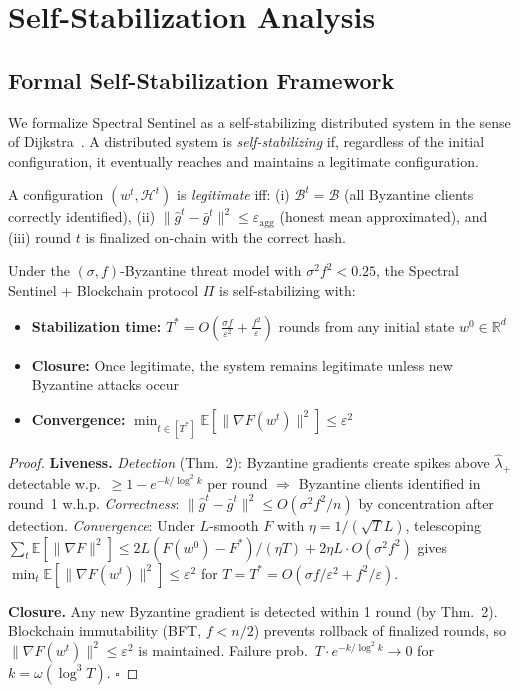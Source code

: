 \documentclass[runningheads]{llncs}
\begin{document}
\section{Self-Stabilization Analysis}
\label{sec:self_stabilization}

\subsection{Formal Self-Stabilization Framework}

We formalize Spectral Sentinel as a self-stabilizing distributed system in the sense of Dijkstra~\cite{dijkstra_self_stab}. A distributed system is \emph{self-stabilizing} if, regardless of the initial configuration, it eventually reaches and maintains a legitimate configuration.

A configuration $(w^t, \mathcal{H}^t)$ is \emph{legitimate} iff: (i) $\mathcal{B}^t = \mathcal{B}$ (all Byzantine clients correctly identified), (ii) $\|\hat{g}^t - \bar{g}^t\|^2 \leq \varepsilon_{\text{agg}}$ (honest mean approximated), and (iii) round $t$ is finalized on-chain with the correct hash.

\begin{theorem}
\label{thm:self_stab}
Under the $(\sigma, f)$-Byzantine threat model with $\sigma^2 f^2 < 0.25$, the Spectral Sentinel + Blockchain protocol $\Pi$ is self-stabilizing with:
\begin{itemize}
\item \textbf{Stabilization time:} $T^* = O\left(\frac{\sigma f}{\varepsilon^2} + \frac{f^2}{\varepsilon}\right)$ rounds from any initial state $w^0 \in \mathbb{R}^d$
\item \textbf{Closure:} Once legitimate, the system remains legitimate unless new Byzantine attacks occur
\item \textbf{Convergence:} $\min_{t \in [T^*]} \mathbb{E}[\|\nabla F(w^t)\|^2] \leq \varepsilon^2$
\end{itemize}
\end{theorem}

\begin{proof}
\textbf{Liveness.} \emph{Detection} (Thm.~2): Byzantine gradients create spikes above $\hat{\lambda}_+$ detectable w.p.\ $\geq 1-e^{-k/\log^2 k}$ per round $\Rightarrow$ Byzantine clients identified in round~1 w.h.p. \emph{Correctness}: $\|\hat{g}^t - \bar{g}^t\|^2 \leq O(\sigma^2 f^2/n)$ by concentration after detection. \emph{Convergence}: Under $L$-smooth $F$ with $\eta = 1/(\sqrt{T}L)$, telescoping $\sum_t \mathbb{E}[\|\nabla F\|^2] \leq 2L(F(w^0)-F^*)/(\eta T) + 2\eta L\cdot O(\sigma^2 f^2)$ gives $\min_t \mathbb{E}[\|\nabla F(w^t)\|^2] \leq \varepsilon^2$ for $T = T^* = O(\sigma f/\varepsilon^2 + f^2/\varepsilon)$.

\textbf{Closure.} Any new Byzantine gradient is detected within 1 round (by Thm.~2). Blockchain immutability (BFT, $f < n/2$) prevents rollback of finalized rounds, so $\|\nabla F(w^t)\|^2 \leq \varepsilon^2$ is maintained. Failure prob.\ $T\cdot e^{-k/\log^2 k} \to 0$ for $k = \omega(\log^3 T)$. \hfill$\square$
\end{proof}
\end{document}

